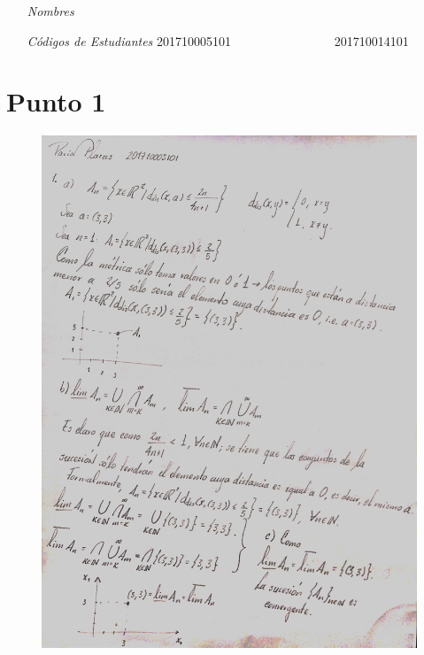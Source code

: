 \documentclass[fleqn]{article}
\begin{document}
 \vspace{0.3cm}
   \begin{itemize}[leftmargin=4.25cm, labelsep=0.5cm]

     \item[\textit{Nombres}]  %
     \item[\textit{Códigos de Estudiantes}] 201710005101$\qquad\qquad\qquad\qquad$ 201710014101 %

   \end{itemize}
\vspace{0.3cm}

\section*{Punto 1}
\begin{figure}[H]
    \centering
    \includegraphics[width=0.85\linewidth]{src/figs/punto1.jpg}
\end{figure}
\newpage
\end{document}

